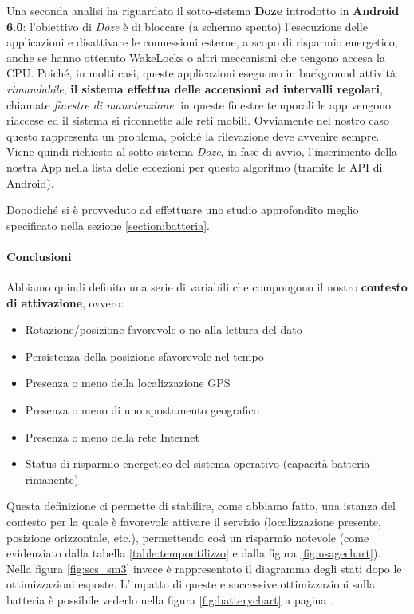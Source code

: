 \documentclass[a4paper,10pt]{memoir}
\begin{document}
Una seconda analisi ha riguardato il sotto-sistema \textbf{Doze} introdotto in \textbf{Android 6.0}: l'obiettivo di \textit{Doze} è di bloccare (a schermo spento) l'esecuzione delle applicazioni e disattivare le connessioni esterne, a scopo di risparmio energetico, anche se hanno ottenuto WakeLocks o altri meccanismi che tengono accesa la CPU. Poiché, in molti casi, queste applicazioni eseguono in background attività \textit{rimandabile}, \textbf{il sistema effettua delle accensioni ad intervalli regolari}, chiamate \textit{finestre di manutenzione}: in queste finestre temporali le app vengono riaccese ed il sistema si riconnette alle reti mobili. Ovviamente nel nostro caso questo rappresenta un problema, poiché la rilevazione deve avvenire sempre. Viene quindi richiesto al sotto-sistema \textit{Doze}, in fase di avvio, l'inserimento della nostra App nella lista delle eccezioni per questo algoritmo (tramite le API di Android).

Dopodiché si è provveduto ad effettuare uno studio approfondito meglio specificato nella sezione \ref{section:batteria}.

\paragraph{Conclusioni} Abbiamo quindi definito una serie di variabili che compongono il nostro \textbf{contesto di attivazione}, ovvero:

\begin{itemize}
\item Rotazione/posizione favorevole o no alla lettura del dato
\item Persistenza della posizione sfavorevole nel tempo
\item Presenza o meno della localizzazione GPS
\item Presenza o meno di uno spostamento geografico
\item Presenza o meno della rete Internet
\item Status di risparmio energetico del sistema operativo (capacità batteria rimanente)
\end{itemize}

Questa definizione ci permette di stabilire, come abbiamo fatto, una istanza del contesto per la quale è favorevole attivare il servizio (localizzazione presente, posizione orizzontale, etc.), permettendo così un risparmio notevole (come evidenziato dalla tabella \ref{table:tempoutilizzo} e dalla figura \ref{fig:usagechart}). Nella figura \ref{fig:scs_sm3} invece è rappresentato il diagramma degli stati dopo le ottimizzazioni esposte. L'impatto di queste e successive ottimizzazioni sulla batteria è possibile vederlo nella figura \ref{fig:batterychart} a pagina \pageref{fig:batterychart}.
\end{document}
